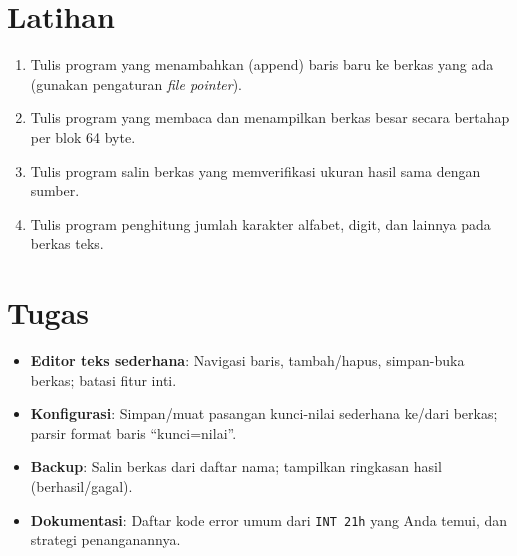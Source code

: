 \section{Latihan}
\begin{enumerate}
  \item Tulis program yang menambahkan (append) baris baru ke berkas yang ada (gunakan pengaturan \textit{file pointer}).
  \item Tulis program yang membaca dan menampilkan berkas besar secara bertahap per blok 64 byte.
  \item Tulis program salin berkas yang memverifikasi ukuran hasil sama dengan sumber.
  \item Tulis program penghitung jumlah karakter alfabet, digit, dan lainnya pada berkas teks.
\end{enumerate}

\section{Tugas}
\begin{itemize}
  \item \textbf{Editor teks sederhana}: Navigasi baris, tambah/hapus, simpan-buka berkas; batasi fitur inti.
  \item \textbf{Konfigurasi}: Simpan/muat pasangan kunci-nilai sederhana ke/dari berkas; parsir format baris ``kunci=nilai''.
  \item \textbf{Backup}: Salin berkas dari daftar nama; tampilkan ringkasan hasil (berhasil/gagal).
  \item \textbf{Dokumentasi}: Daftar kode error umum dari \texttt{INT 21h} yang Anda temui, dan strategi penanganannya.
\end{itemize}

